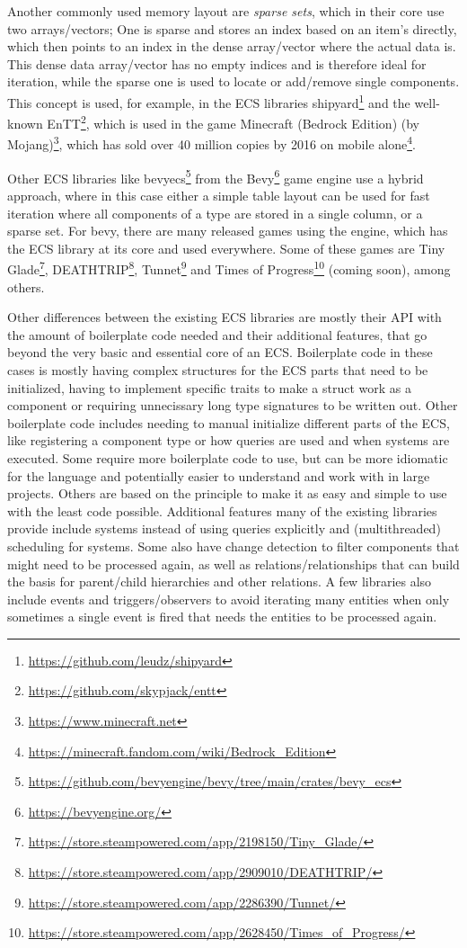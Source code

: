 Another commonly used memory layout are \textit{sparse sets}, which in their core use two arrays/vectors; One is sparse and stores an index based on an item's directly, which then points to an index in the dense array/vector where the actual data is. This dense data array/vector has no empty indices and is therefore ideal for iteration, while the sparse one is used to locate or add/remove single components. This concept is used, for example, in the ECS libraries \textsf{shipyard}\footnote{\url{https://github.com/leudz/shipyard}} and the well-known \textsf{EnTT}\footnote{\url{https://github.com/skypjack/entt}}, which is used in the game \textsf{Minecraft (Bedrock Edition)} (by Mojang)\footnote{\url{https://www.minecraft.net}}, which has sold over 40 million copies by 2016 on mobile alone\footnote{\url{https://minecraft.fandom.com/wiki/Bedrock_Edition}}.

Other ECS libraries like \textsf{bevy\textunderscore ecs}\footnote{\url{https://github.com/bevyengine/bevy/tree/main/crates/bevy_ecs}} from the \textsf{Bevy}\footnote{\url{https://bevyengine.org/}} game engine use a hybrid approach, where in this case either a simple table layout can be used for fast iteration where all components of a type are stored in a single column, or a sparse set. For bevy, there are many released games using the engine, which has the ECS library at its core and used everywhere. Some of these games are \textsf{Tiny Glade}\footnote{\url{https://store.steampowered.com/app/2198150/Tiny_Glade/}}, \textsf{DEATHTRIP}\footnote{\url{https://store.steampowered.com/app/2909010/DEATHTRIP/}}, \textsf{Tunnet}\footnote{\url{https://store.steampowered.com/app/2286390/Tunnet/}} and \textsf{Times of Progress}\footnote{\url{https://store.steampowered.com/app/2628450/Times_of_Progress/}} (coming soon), among others.

Other differences between the existing ECS libraries are mostly their API with the amount of boilerplate code needed and their additional features, that go beyond the very basic and essential core of an ECS. Boilerplate code in these cases is mostly having complex structures for the ECS parts that need to be initialized, having to implement specific traits to make a struct work as a component or requiring unnecissary long type signatures to be written out. Other boilerplate code includes needing to manual initialize different parts of the ECS, like registering a component type or how queries are used and when systems are executed. Some require more boilerplate code to use, but can be more idiomatic for the language and potentially easier to understand and work with in large projects. Others are based on the principle to make it as easy and simple to use with the least code possible. Additional features many of the existing libraries provide include systems instead of using queries explicitly and (multithreaded) scheduling for systems. Some also have change detection to filter components that might need to be processed again, as well as relations/relationships that can build the basis for parent/child hierarchies and other relations. A few libraries also include events and triggers/observers to avoid iterating many entities when only sometimes a single event is fired that needs the entities to be processed again.

